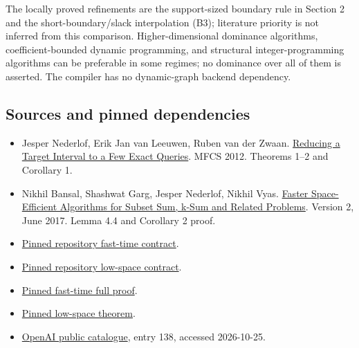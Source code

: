 The locally proved refinements are the support-sized boundary rule in Section 2 and the short-boundary/slack interpolation (B3); literature priority is not inferred from this comparison. Higher-dimensional dominance algorithms, coefficient-bounded dynamic programming, and structural integer-programming algorithms can be preferable in some regimes; no dominance over all of them is asserted. The compiler has no dynamic-graph backend dependency.

\hypertarget{af-77b0bb6793-sources-and-pinned-dependencies}{%
\subsection{Sources and pinned dependencies}\label{af-77b0bb6793-sources-and-pinned-dependencies}}

\begin{itemize}
\tightlist
\item
  Jesper Nederlof, Erik Jan van Leeuwen, Ruben van der Zwaan. \href{https://arxiv.org/pdf/1208.4225}{Reducing a Target Interval to a Few Exact Queries}. MFCS 2012. Theorems 1--2 and Corollary 1.
\item
  Nikhil Bansal, Shashwat Garg, Jesper Nederlof, Nikhil Vyas. \href{https://arxiv.org/pdf/1612.02788}{Faster Space-Efficient Algorithms for Subset Sum, k-Sum and Related Problems}. Version 2, June 2017. Lemma 4.4 and Corollary 2 proof.
\item
  \href{https://github.com/icekylinx/algorithm-frontier/blob/37b31138bf102a83d9efb2cbe44437eec45ae3c2/problems/subset-sum-fast-deterministic/README.md}{Pinned repository fast-time contract}.
\item
  \href{https://github.com/icekylinx/algorithm-frontier/blob/37b31138bf102a83d9efb2cbe44437eec45ae3c2/problems/subset-sum-low-space-deterministic/README.md}{Pinned repository low-space contract}.
\item
  \href{https://github.com/icekylinx/algorithm-frontier/blob/37b31138bf102a83d9efb2cbe44437eec45ae3c2/problems/subset-sum-fast-deterministic/proof.md}{Pinned fast-time full proof}.
\item
  \href{https://github.com/icekylinx/algorithm-frontier/blob/37b31138bf102a83d9efb2cbe44437eec45ae3c2/problems/subset-sum-low-space-deterministic/proof.md}{Pinned low-space theorem}.
\item
  \href{https://github.com/openai/math/blob/main/overview.tex}{OpenAI public catalogue}, entry 138, accessed 2026-10-25.
\end{itemize}
